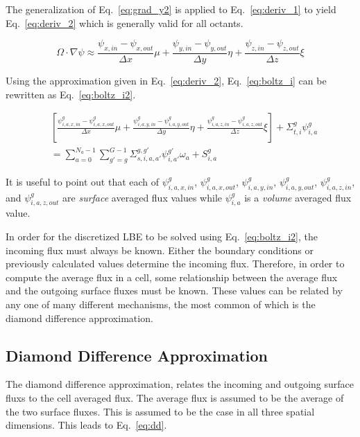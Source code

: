 The generalization of Eq.~\ref{eq:grad_y2} is applied to Eq.~\ref{eq:deriv_1} to yield Eq.~\ref{eq:deriv_2} which is generally valid for all octants.

\begin{equation} \label{eq:deriv_2}
\Omega \cdot \nabla \psi \approx 
\frac{\psi_{x,in} - \psi_{x,out}}{\Delta x} \mu + 
\frac{\psi_{y,in} - \psi_{y,out}}{\Delta y} \eta + 
\frac{\psi_{z,in} - \psi_{z,out}}{\Delta z} \xi
\end{equation}

Using the approximation given in Eq.~\ref{eq:deriv_2}, Eq.~\ref{eq:boltz_i} can be rewritten as Eq.~\ref{eq:boltz_i2}.

\begin{equation} \label{eq:boltz_i2}
\begin{split}
&\left[ 
\frac{\psi_{i,a,x,in}^g - \psi_{i,a,x,out}^g}{\Delta x} \mu + 
\frac{\psi_{i,a,y,in}^g - \psi_{i,a,y,out}^g}{\Delta y} \eta + 
\frac{\psi_{i,a,z,in}^g - \psi_{i,a,z,out}^g}{\Delta z} \xi
\right]
+ \Sigma_{t,i}^g \psi_{i,a}^{g} \\
& = 
\sum_{a=0}^{N_a-1} \sum_{g'=g}^{G-1} \Sigma_{s, i, a, a'}^{g, g'} \psi_{i, a'}^{g'} \omega_a + S_{i,a}^g
\end{split}
\end{equation}

It is useful to point out that each of $\psi_{i,a,x,in}^g$, $\psi_{i,a,x,out}^g$, $\psi_{i,a,y,in}^g$, $\psi_{i,a,y,out}^g$, $\psi_{i,a,z,in}^g$, and $\psi_{i,a,z,out}^g$ are \textit{surface} averaged flux values while $\psi_{i,a}^{g}$ is a \textit{volume} averaged flux value.

In order for the discretized LBE to be solved using Eq.~\ref{eq:boltz_i2}, the incoming flux must always be known. Either the boundary conditions or previously calculated values determine the incoming flux. Therefore, in order to compute the average flux in a cell, some relationship between the average flux and the outgoing surface fluxes must be known. These values can be related by any one of many different mechanisms, the most common of which is the diamond difference approximation.

\subsection{Diamond Difference Approximation}

The diamond difference approximation, relates the incoming and outgoing surface fluxs to the cell averaged flux. The average flux is assumed to be the average of the two surface fluxes. This is assumed to be the case in all three spatial dimensions. This leads to Eq.~\ref{eq:dd}.


